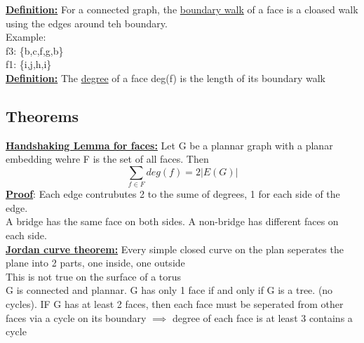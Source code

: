 \documentclass[12pt]{article}
\newcommand{\myt}[1]{\textbf{\underline{#1}}}
\begin{document}
	\myt{Definition:} For a connected graph, the \underline{boundary walk} of a face is a cloased walk using the edges around teh boundary.\\
	
	Example:\\
	f3: \{b,c,f,g,b\}\\
	f1: \{i,j,h,i\}\\
	
	\myt{Definition:} The \underline{degree} of a face deg(f) is the length of its boundary walk\\
	
	\subsection*{Theorems}
	\myt{Handshaking Lemma for faces:} Let G be a plannar graph with a planar embedding wehre F is the set of all faces. Then\\
	$$\sum_{f \in F} deg(f) = 2|E(G)|$$
	\myt{Proof}: Each edge contrubutes 2 to the sume of degrees, 1 for each side of the edge.\\
	
	A bridge has the same face on both sides. A non-bridge has different faces on each side.\\
	
	\myt{Jordan curve theorem:} Every simple closed curve on the plan seperates the plane into 2 parts, one inside, one outside\\
	
	This is not true on the surface of a torus\\
	
	G is connected and plannar. G has only 1 face if and only if G is a tree. (no cycles). IF G has at least 2 faces, then each face must be seperated from other faces via a cycle on its boundary $\implies$ degree of each face is at least 3 contains a cycle
	
	
\end{document}
